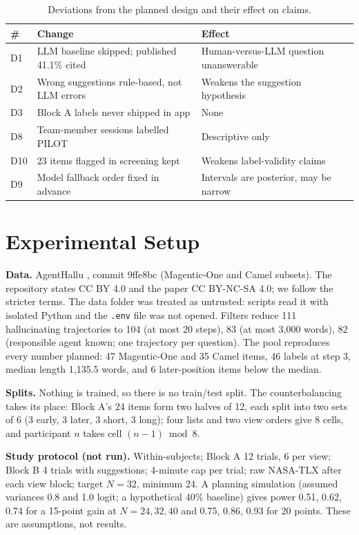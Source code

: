 \documentclass[conference]{IEEEtran}
\begin{document}
\begin{table}[t]
\centering\footnotesize
\caption{Deviations from the planned design and their effect on claims.}
\label{tab:dev}
\begin{tabular}{@{}p{0.5cm}p{3.7cm}p{3.5cm}@{}}
\toprule
\# & Change & Effect\\
\midrule
D1 & LLM baseline skipped; published 41.1\% cited & Human-versus-LLM question unanswerable\\
D2 & Wrong suggestions rule-based, not LLM errors & Weakens the suggestion hypothesis\\
D3 & Block A labels never shipped in app & None\\
D8 & Team-member sessions labelled PILOT & Descriptive only\\
D10 & 23 items flagged in screening kept & Weakens label-validity claims\\
D9 & Model fallback order fixed in advance & Intervals are posterior, may be narrow\\
\bottomrule
\end{tabular}
\end{table}

\section{Experimental Setup}\label{sec:setup}
\textbf{Data.} AgentHallu \cite{liu2026agenthallu}, commit 9ffe8bc (Magentic-One and Camel subsets). The repository states CC BY 4.0 and the paper CC BY-NC-SA 4.0; we follow the stricter terms. The data folder was treated as untrusted: scripts read it with isolated Python and the \texttt{.env} file was not opened. Filters reduce 111 hallucinating trajectories to 104 (at most 20 steps), 83 (at most 3,000 words), 82 (responsible agent known; one trajectory per question). The pool reproduces every number planned: 47 Magentic-One and 35 Camel items, 46 labels at step 3, median length 1,135.5 words, and 6 later-position items below the median.

\textbf{Splits.} Nothing is trained, so there is no train/test split. The counterbalancing takes its place: Block A's 24 items form two halves of 12, each split into two sets of 6 (3 early, 3 later, 3 short, 3 long); four lists and two view orders give 8 cells, and participant $n$ takes cell $(n-1)\bmod 8$.

\textbf{Study protocol (not run).} Within-subjects; Block A 12 trials, 6 per view; Block B 4 trials with suggestions; 4-minute cap per trial; raw NASA-TLX after each view block; target $N=32$, minimum 24. A planning simulation (assumed variances 0.8 and 1.0 logit; a hypothetical 40\% baseline) gives power 0.51, 0.62, 0.74 for a 15-point gain at $N=24,32,40$ and 0.75, 0.86, 0.93 for 20 points. These are assumptions, not results.
\end{document}

